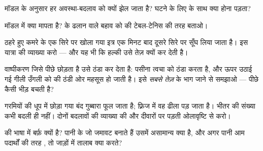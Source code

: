 \begin{exercise}[$\star$]\label{exo:g7:states-of-matter:6}
मॉडल के अनुसार  हर अवस्था-बदलाव को क्यों झेल जाता है?
 घटने के लिए  के साथ क्या होना पड़ता?
\end{exercise}

\begin{exercise}[$\star$]\label{exo:g7:states-of-matter:7}
मॉडल में  क्या मापता है?  के ढलान वाले बहाव को  की
टेबल-टेनिस की तरह बताओ।
\end{exercise}

\begin{exercise}[$\star$]\label{exo:g7:states-of-matter:8}
ठहरे हुए कमरे के एक सिरे पर खोला गया इत्र एक मिनट बाद दूसरे सिरे पर
सूँघ लिया जाता है। इस यात्रा की व्याख्या करो --- और यह भी कि हल्की 
उसे तेज़ क्यों कर देती है।
\end{exercise}

\begin{exercise}[$\star\star$]\label{exo:g7:states-of-matter:9}
वाष्पीकरण जिसे पीछे छोड़ता है उसे ठंडा कर देता है: पसीना त्वचा को
ठंडा करता है, और ऊपर उठाई गई गीली उँगली को  की ठंडी ओर महसूस हो
जाती है। इसे \emph{सबसे तेज़}  के भाग जाने से समझाओ --- पीछे
कैसी भीड़ बचती है?
\end{exercise}

\begin{exercise}[$\star\star$]\label{exo:g7:states-of-matter:10}
गरमियों की धूप में छोड़ा गया बंद गुब्बारा फूल जाता है; फ़्रिज में वह
ढीला पड़ जाता है। भीतर  की संख्या कभी बदली ही नहीं। दोनों बदलावों
की व्याख्या  की  और दीवारों पर पड़ती ओलावृष्टि से करो।
\end{exercise}

\begin{exercise}[$\star\star$]\label{exo:g7:states-of-matter:11}
 की भाषा में बर्फ़ क्यों  है? पानी के  जो जमावट बनाते
हैं उसमें असामान्य क्या है, और अगर पानी आम पदार्थों की तरह , तो
जाड़ों में तालाब क्या करते?
\end{exercise}

